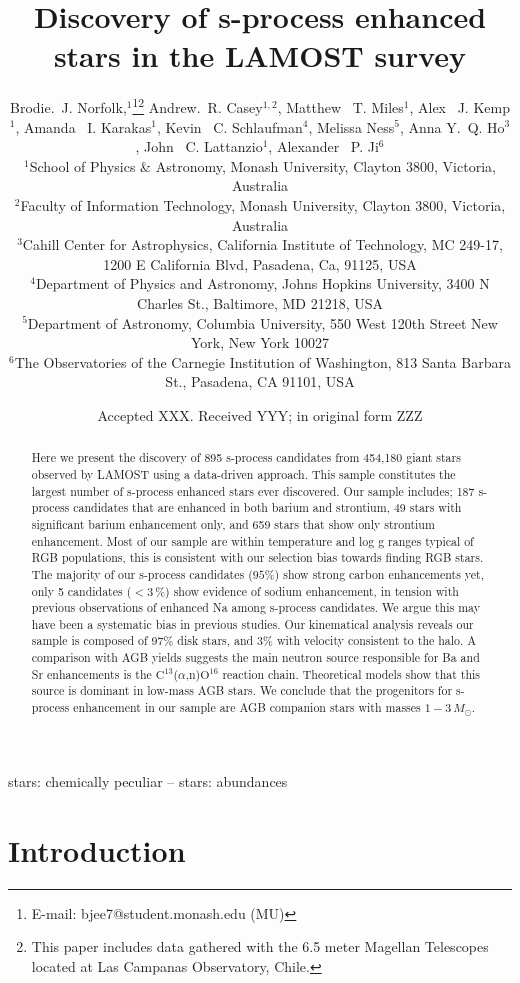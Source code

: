 \documentclass[a4paper,fleqn,usenatbib]{mnras}
\title[S-process stars in LAMOST]{Discovery of s-process enhanced stars in the LAMOST survey}
\author[Brodie.~J. Norfolk et al.]{Brodie.~J. Norfolk,$^{1}$\thanks{E-mail: bjee7@student.monash.edu (MU)}\thanks{This paper includes data gathered with the 6.5 meter Magellan Telescopes located at Las Campanas Observatory, Chile.}
Andrew.~R. Casey$^{1,2}$,
Matthew ~T. Miles$^{1}$,
Alex ~J. Kemp$^{1}$, \newauthor
Amanda ~I. Karakas$^{1}$,
Kevin ~C. Schlaufman$^{4}$,
Melissa Ness$^{5}$,
Anna Y.~Q. Ho$^{3}$, \newauthor
John ~C. Lattanzio$^{1}$, 
Alexander ~P. Ji$^{6}$
\\
$^{1}$School of Physics \& Astronomy, Monash University, Clayton 3800, Victoria, Australia\\
$^{2}$Faculty of Information Technology, Monash University, Clayton 3800, Victoria, Australia\\
$^{3}$Cahill Center for Astrophysics, California Institute of Technology, MC 249-17, 1200 E California Blvd, Pasadena, Ca, 91125, USA\\
$^{4}$Department of Physics and Astronomy, Johns Hopkins University, 3400 N Charles St., Baltimore, MD 21218, USA
\\
$^{5}$Department of Astronomy, Columbia University, 550 West 120th Street New York, New York 10027
\\
$^{6}$The Observatories of the Carnegie Institution of Washington, 813 Santa Barbara St., Pasadena, CA 91101, USA
}
\date{Accepted XXX. Received YYY; in original form ZZZ}
\begin{document}
\label{firstpage}
\pagerange{\pageref{firstpage}--\pageref{lastpage}}
\maketitle

\begin{abstract}

Here we present the discovery of 895 s-process candidates from 454,180 giant stars observed by LAMOST using a data-driven approach. This sample constitutes the largest number of s-process enhanced stars ever discovered. Our sample includes; 187 s-process candidates that are enhanced in both barium and strontium, 49 stars with significant barium enhancement only, and 659 stars that show only strontium enhancement. Most of our sample are within temperature and log g ranges typical of RGB populations, this is consistent with our selection bias towards finding RGB stars. The majority of our s-process candidates ($95\%$) show strong carbon enhancements yet, only 5 candidates ($<3$\,\%) show evidence of sodium enhancement, in tension with previous observations of enhanced Na among s-process candidates. We argue this may have been a systematic bias in previous studies. Our kinematical analysis reveals our sample is composed of 97\% disk stars, and 3\% with velocity consistent to the halo. A comparison with AGB yields suggests the main neutron source responsible for Ba and Sr enhancements is the $\text{C}^{13}$(\textrm{$\alpha$},n)$\text{O}^{16}$ reaction chain. Theoretical models show that this source is dominant in low-mass AGB stars. We conclude that the progenitors for s-process enhancement in our sample are AGB companion stars with masses $1 - 3\,M_{\odot}$. 

\end{abstract}

\begin{keywords}
stars: chemically peculiar -- stars: abundances
\end{keywords}

\section{Introduction} \label{sec:intro}
\end{document}
